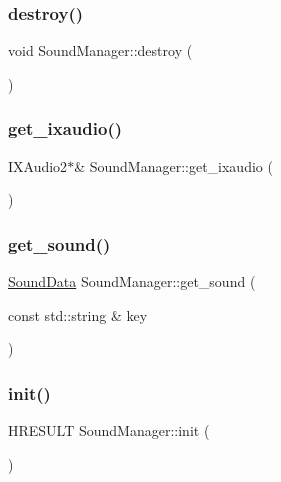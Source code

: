 \subsubsection{\texorpdfstring{destroy()}{destroy()}}
{\footnotesize\ttfamily void Sound\+Manager\+::destroy (\begin{DoxyParamCaption}{ }\end{DoxyParamCaption})}

\mbox{\label{class_sound_manager_acf958b3ac76bea62fca0d4c9df8028b6}} 
\subsubsection{\texorpdfstring{get\+\_\+ixaudio()}{get\_ixaudio()}}
{\footnotesize\ttfamily I\+X\+Audio2$\ast$\& Sound\+Manager\+::get\+\_\+ixaudio (\begin{DoxyParamCaption}{ }\end{DoxyParamCaption})\hspace{0.3cm}{\ttfamily [inline]}}

\mbox{\label{class_sound_manager_a71867920306703ef2f3e5331cda3c4de}} 
\subsubsection{\texorpdfstring{get\+\_\+sound()}{get\_sound()}}
{\footnotesize\ttfamily \mbox{\hyperlink{struct_sound_data}{Sound\+Data}} Sound\+Manager\+::get\+\_\+sound (\begin{DoxyParamCaption}\item[{const std\+::string \&}]{key }\end{DoxyParamCaption})}

\mbox{\label{class_sound_manager_abbebeb61e63a5ec91e8d3081759cf598}} 
\subsubsection{\texorpdfstring{init()}{init()}}
{\footnotesize\ttfamily H\+R\+E\+S\+U\+LT Sound\+Manager\+::init (\begin{DoxyParamCaption}{ }\end{DoxyParamCaption})}

